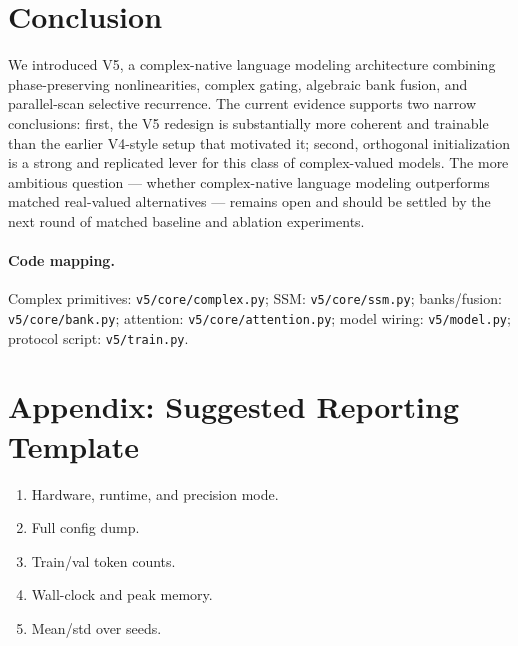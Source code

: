 \documentclass[11pt]{article}
\begin{document}
\section{Conclusion}
We introduced V5, a complex-native language modeling architecture combining phase-preserving nonlinearities, complex gating, algebraic bank fusion, and parallel-scan selective recurrence.
The current evidence supports two narrow conclusions: first, the V5 redesign is substantially more coherent and trainable than the earlier V4-style setup that motivated it; second, orthogonal initialization is a strong and replicated lever for this class of complex-valued models.
The more ambitious question --- whether complex-native language modeling outperforms matched real-valued alternatives --- remains open and should be settled by the next round of matched baseline and ablation experiments.

\paragraph{Code mapping.}
Complex primitives: \texttt{v5/core/complex.py}; SSM: \texttt{v5/core/ssm.py}; banks/fusion: \texttt{v5/core/bank.py}; attention: \texttt{v5/core/attention.py}; model wiring: \texttt{v5/model.py}; protocol script: \texttt{v5/train.py}.




\appendix
\section{Appendix: Suggested Reporting Template}
\begin{enumerate}[leftmargin=1.2em]
  \item Hardware, runtime, and precision mode.
  \item Full config dump.
  \item Train/val token counts.
  \item Wall-clock and peak memory.
  \item Mean/std over seeds.
\end{enumerate}
\end{document}

